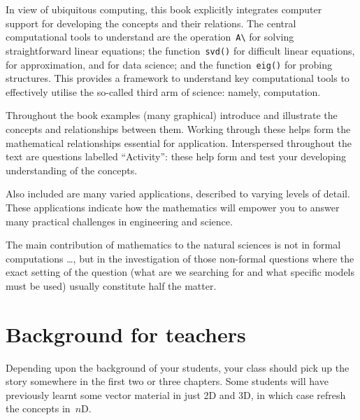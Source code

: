 In view of ubiquitous computing, this book explicitly integrates computer support for developing the concepts and their relations.
The central computational tools to understand are the operation~\verb|A\| for solving straightforward linear equations; the function~\verb|svd()| for difficult linear equations, for approximation, and for data science; and the function~\verb|eig()| for probing structures.
This provides a framework to understand key computational tools to effectively utilise the so-called third arm of science: namely, computation. 

Throughout the book examples (many graphical) introduce and illustrate the concepts and relationships between them.
Working through these helps form the mathematical relationships essential for application.
Interspersed throughout the text are questions labelled ``Activity'': these help form and test your developing understanding of the concepts.

Also included are many varied applications, described to varying levels of detail.
These applications indicate how the mathematics will empower you to answer many practical challenges in engineering and science.


\begin{quoted}{\cite{Arnold2014}}%
The main contribution of mathematics to the natural sciences is not in formal computations \ldots, but in the investigation of those non-formal questions where the exact setting of the question (what are we searching for and what specific models must be used) usually constitute half the matter.
%
\end{quoted}








\section*{Background for teachers}

Depending upon the background of your students, your class should pick up the story somewhere in the first two or three chapters.
Some students will have previously learnt some vector material in just 2D and 3D,  in which case refresh the concepts in~\(n\)D.

